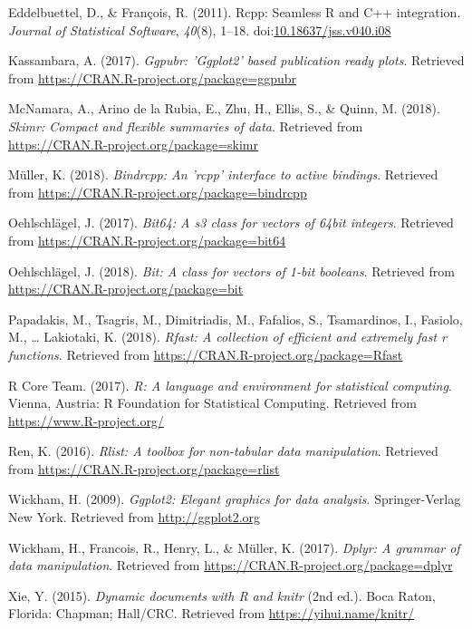 \documentclass[floatsintext,man]{apa6}
\theoremstyle{definition}
\theoremstyle{definition}
\theoremstyle{definition}
\theoremstyle{remark}
\begin{document}
\hypertarget{ref-R-Rcpp_a}{}
Eddelbuettel, D., \& François, R. (2011). Rcpp: Seamless R and C++
integration. \emph{Journal of Statistical Software}, \emph{40}(8),
1--18.
doi:\href{https://doi.org/10.18637/jss.v040.i08}{10.18637/jss.v040.i08}

\hypertarget{ref-R-ggpubr}{}
Kassambara, A. (2017). \emph{Ggpubr: 'Ggplot2' based publication ready
plots}. Retrieved from \url{https://CRAN.R-project.org/package=ggpubr}

\hypertarget{ref-R-skimr}{}
McNamara, A., Arino de la Rubia, E., Zhu, H., Ellis, S., \& Quinn, M.
(2018). \emph{Skimr: Compact and flexible summaries of data}. Retrieved
from \url{https://CRAN.R-project.org/package=skimr}

\hypertarget{ref-R-bindrcpp}{}
Müller, K. (2018). \emph{Bindrcpp: An 'rcpp' interface to active
bindings}. Retrieved from
\url{https://CRAN.R-project.org/package=bindrcpp}

\hypertarget{ref-R-bit64}{}
Oehlschlägel, J. (2017). \emph{Bit64: A s3 class for vectors of 64bit
integers}. Retrieved from \url{https://CRAN.R-project.org/package=bit64}

\hypertarget{ref-R-bit}{}
Oehlschlägel, J. (2018). \emph{Bit: A class for vectors of 1-bit
booleans}. Retrieved from \url{https://CRAN.R-project.org/package=bit}

\hypertarget{ref-R-Rfast}{}
Papadakis, M., Tsagris, M., Dimitriadis, M., Fafalios, S., Tsamardinos,
I., Fasiolo, M., \ldots{} Lakiotaki, K. (2018). \emph{Rfast: A
collection of efficient and extremely fast r functions}. Retrieved from
\url{https://CRAN.R-project.org/package=Rfast}

\hypertarget{ref-R-base}{}
R Core Team. (2017). \emph{R: A language and environment for statistical
computing}. Vienna, Austria: R Foundation for Statistical Computing.
Retrieved from \url{https://www.R-project.org/}

\hypertarget{ref-R-rlist}{}
Ren, K. (2016). \emph{Rlist: A toolbox for non-tabular data
manipulation}. Retrieved from
\url{https://CRAN.R-project.org/package=rlist}

\hypertarget{ref-R-ggplot2}{}
Wickham, H. (2009). \emph{Ggplot2: Elegant graphics for data analysis}.
Springer-Verlag New York. Retrieved from \url{http://ggplot2.org}

\hypertarget{ref-R-dplyr}{}
Wickham, H., Francois, R., Henry, L., \& Müller, K. (2017). \emph{Dplyr:
A grammar of data manipulation}. Retrieved from
\url{https://CRAN.R-project.org/package=dplyr}

\hypertarget{ref-R-knitr}{}
Xie, Y. (2015). \emph{Dynamic documents with R and knitr} (2nd ed.).
Boca Raton, Florida: Chapman; Hall/CRC. Retrieved from
\url{https://yihui.name/knitr/}

\endgroup
\end{document}
